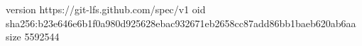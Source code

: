 version https://git-lfs.github.com/spec/v1
oid sha256:b23e646e6b1f0a980d925628ebac932671eb2658cc87add86bb1baeb620ab6aa
size 5592544

